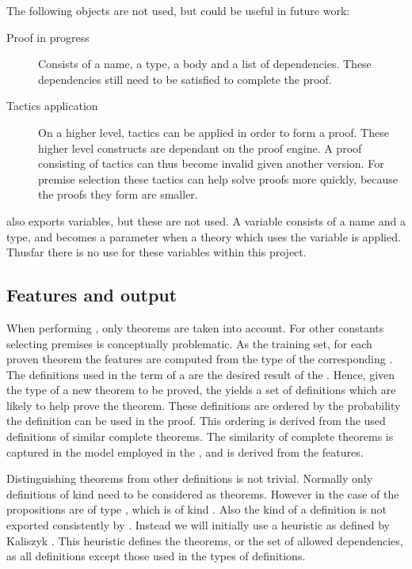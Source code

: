 The following objects are not used, but could be useful in future work:
\begin{description}
    \item[Proof in progress]
        Consists of a name, a type, a body and a list of dependencies.
        These dependencies still need to be satisfied to complete the proof.
    \item[Tactics application]
        On a higher level, tactics can be applied in order to form a proof.
        These higher level constructs are dependant on the proof engine.
        A proof consisting of tactics can thus become invalid given another \coq version.
        For premise selection these tactics can help solve proofs more quickly, because the proofs they form are smaller.
\end{description}

\coq also exports variables, but these are not used.
A variable consists of a name and a type, and becomes a parameter when a theory which uses the variable is applied.
Thusfar there is no use for these variables within this project.

\subsection{Features and output}
\label{section:features}
When performing \premiseselection, only theorems are taken into account.
For other constants selecting premises is conceptually problematic.
As the training set, for each proven theorem the features are computed from the type of the corresponding \coqobj.
The definitions used in the term of a \coqobj are the desired result of the \premiseselection.
Hence, given the type of a new theorem to be proved, the \premiseselection yields a set of definitions which are likely to help prove the theorem.
These definitions are ordered by the probability the definition can be used in the proof.
This ordering is derived from the used definitions of similar complete theorems.
The similarity of complete theorems is captured in the model employed in the \premiseselection, and is derived from the features.

Distinguishing theorems from other definitions is not trivial.
Normally only definitions of kind \prop need to be considered as theorems.
However in the case of \corn the propositions are of type \cprop, which is of kind \kindtype.
Also the kind of a definition is not exported consistently by \coq \citationeeded.
Instead we will initially use a heuristic as defined by Kaliszyk \cite{kaliszyk2014machine}.
This heuristic defines the theorems, or the set of allowed dependencies, as all definitions except those used in the types of definitions.

